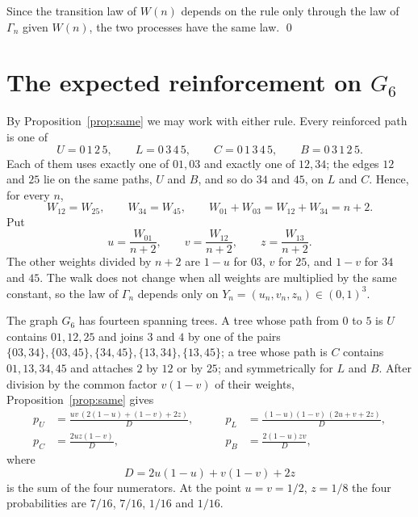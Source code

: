 \documentclass[11pt]{amsart}
\theoremstyle{remark}
\begin{document}
Since the transition law of $W(n)$ depends on the rule only through the law of $\Gamma_n$ given $W(n)$, the two processes have the same law. \qed

\section{The expected reinforcement on \texorpdfstring{$G_6$}{G6}}\label{sec:drift}

By Proposition~\ref{prop:same} we may work with either rule. Every reinforced path is one of
\[
U=0\,1\,2\,5,\qquad L=0\,3\,4\,5,\qquad C=0\,1\,3\,4\,5,\qquad B=0\,3\,1\,2\,5 .
\]
Each of them uses exactly one of $01,03$ and exactly one of $12,34$; the edges $12$ and $25$ lie on the same paths, $U$ and $B$, and so do $34$ and $45$, on $L$ and $C$. Hence, for every $n$,
\[
W_{12}=W_{25},\qquad W_{34}=W_{45},\qquad W_{01}+W_{03}=W_{12}+W_{34}=n+2 .
\]
Put
\[
u=\frac{W_{01}}{n+2},\qquad v=\frac{W_{12}}{n+2},\qquad z=\frac{W_{13}}{n+2}.
\]
The other weights divided by $n+2$ are $1-u$ for $03$, $v$ for $25$, and $1-v$ for $34$ and $45$. The walk does not change when all weights are multiplied by the same constant, so the law of $\Gamma_n$ depends only on $Y_n=(u_n,v_n,z_n)\in(0,1)^3$.

The graph $G_6$ has fourteen spanning trees. A tree whose path from $0$ to $5$ is $U$ contains $01,12,25$ and joins $3$ and $4$ by one of the pairs $\{03,34\},\{03,45\},\{34,45\},\{13,34\},\{13,45\}$; a tree whose path is $C$ contains $01,13,34,45$ and attaches $2$ by $12$ or by $25$; and symmetrically for $L$ and $B$. After division by the common factor $v(1-v)$ of their weights, Proposition~\ref{prop:same} gives
\begin{equation}\label{eq:paths}
\begin{aligned}
p_U&=\frac{uv\,(2(1-u)+(1-v)+2z)}{D},&\qquad p_L&=\frac{(1-u)(1-v)\,(2u+v+2z)}{D},\\
p_C&=\frac{2uz(1-v)}{D},&\qquad p_B&=\frac{2(1-u)zv}{D},
\end{aligned}
\end{equation}
where
\[
D=2u(1-u)+v(1-v)+2z
\]
is the sum of the four numerators. At the point $u=v=1/2$, $z=1/8$ the four probabilities are $7/16$, $7/16$, $1/16$ and $1/16$.
\end{document}
